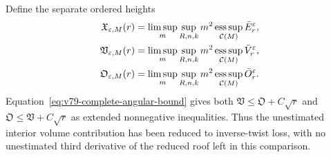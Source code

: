 Define the separate ordered heights
\begin{equation}\label{eq:v79-ordered-budgets}
 \begin{split}
 \mathfrak X_{\varepsilon,M}(r)
 &=\limsup_m\sup_{R,n,k}m^2\esssup_{\mathcal C(M)}\bar E_r^\varepsilon,\\
 \mathfrak V_{\varepsilon,M}(r)
 &=\limsup_m\sup_{R,n,k}m^2\esssup_{\mathcal C(M)}\bar V_r^\varepsilon,\\
 \mathfrak O_{\varepsilon,M}(r)
 &=\limsup_m\sup_{R,n,k}m^2\esssup_{\mathcal C(M)}\bar O_r^\varepsilon.
 \end{split}
\end{equation}
Equation~\eqref{eq:v79-complete-angular-bound} gives both
$\mathfrak V\le\mathfrak O+C\sqrt r$ and
$\mathfrak O\le\mathfrak V+C\sqrt r$ as extended nonnegative inequalities.
Thus the unestimated interior volume contribution has been reduced to
inverse-twist loss, with no unestimated third derivative of the reduced
roof left in this comparison.

